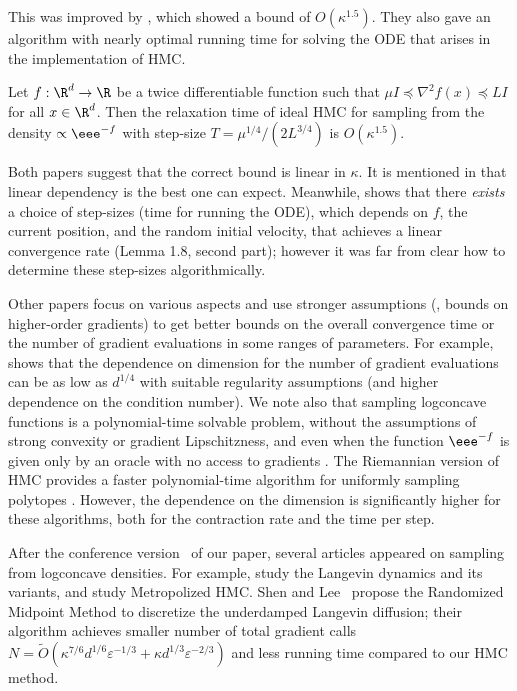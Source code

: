 \documentclass{toc}
\newcommand{\grad}{\nabla}
\newcommand{\eps}{\varepsilon}
\begin{document}
This was improved by \cite{LSV18}, which showed a bound of $O(\kappa^{1.5})$. 
They also gave an algorithm with nearly optimal running time for solving the ODE that arises in the implementation of HMC.  

\begin{theorem}
	Let $f:\R^d \to\R$ be a twice differentiable function such that $\mu I \preceq \grad^2 f(x) \preceq L I$ for all $x\in\R^d$. 
	Then the relaxation time of ideal HMC for sampling from the density $\propto \eee^{-f}$ with step-size $T = \mu^{1/4}/(2L^{3/4})$ is $O(\kappa^{1.5})$.  
\end{theorem}


Both papers suggest that the correct bound is linear in $\kappa$. 
It is mentioned in \cite{MS17} that linear dependency is the best one can expect. 
Meanwhile, \cite{LSV18} shows that there {\em exists} a choice of step-sizes (time for running the ODE), which depends on $f$, the current position, and the random initial velocity, that achieves a linear convergence rate (Lemma 1.8, second part); however it was far from clear how to determine these step-sizes algorithmically.  

Other papers focus on various aspects and use stronger assumptions (\eg, bounds on higher-order gradients) to get better bounds on the overall convergence time or the number of gradient evaluations in some ranges of parameters. For example, \cite{MV18} shows that the dependence on dimension for the number of gradient evaluations can be as low as $d^{1/4}$ with suitable regularity assumptions (and higher dependence on the condition number). We note also that sampling logconcave functions is a polynomial-time solvable problem, without the assumptions of strong convexity or gradient Lipschitzness, and even when the function $\eee^{-f}$ is given only by an oracle with no access to gradients \cite{AK91, LV06}. The Riemannian version of HMC provides a faster polynomial-time algorithm for uniformly sampling polytopes \cite{LV18}. However, the dependence on the dimension is significantly higher for these algorithms, both for the contraction rate and the time per step. 

After the %
conference version~\cite{conf-version}   %
of our paper, %
several articles appeared  %
%
on sampling from logconcave densities. 
For example, \cite{CLW19, DRK19, MMWBJ19, SL19, W19} study the 
Langevin dynamics and its variants, and \cite{CDWY19, LST20} 
study Metropolized HMC. 
%
%
%
Shen and Lee~\cite{SL19} propose the  %
Randomized Midpoint Method to discretize the underdamped Langevin diffusion; 
their algorithm achieves smaller number of total gradient calls
%
%
%
$N = \tilde{O}( \kappa^{7/6} d^{1/6} \eps^{-1/3}
 + \kappa d^{1/3} \eps^{-2/3} )$ 
and less running time compared to our HMC method. 
%
%
%
%
\end{document}
